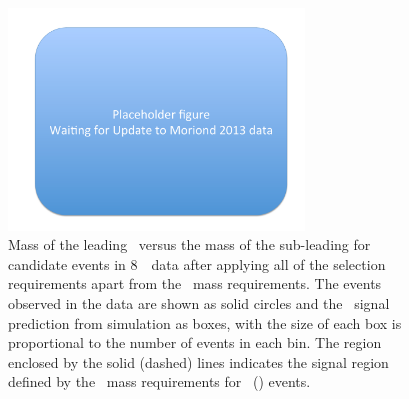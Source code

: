  \begin{figure}[htbp]
 \begin{center}
  \includegraphics[width=0.7\textwidth]{placeholder}\hfill
  \caption[Mass of the leading \leppair\ versus the mass of the
  sub-leading \leppair\ for candidate events in 8~\tev\ data, after applying all of the selection
  requirements apart from the \dilepton\ mass requirements.]
  {\small Mass of the leading \leppair\ versus the mass of the
  sub-leading \leppair for candidate events in 8~\tev\ data after
  applying all of the selection
  requirements apart from the \dilepton\ mass requirements.
  The events observed in the data are shown as solid circles and the \ZZsllll\
  signal prediction from simulation as boxes, with 
  the size of each box is proportional to the number of events in each bin.  
  The region enclosed by the solid (dashed) lines indicates the signal region defined by the
  \dilepton\ mass requirements for \ZZ\ (\ZZs) events.
   }
    \label{fig:zzdists-Zmass2D-eight}
 \end{center}
 \end{figure}


